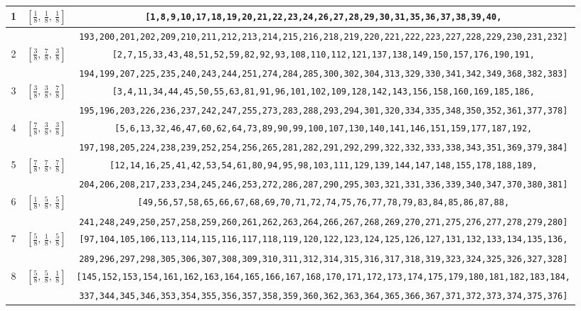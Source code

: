 \documentclass[fleqn,8pt]{jsarticle}
\begin{document}
\begin{longtable}{ccc}
1 & $\left[ \frac{1}{8},\, \frac{1}{8},\, \frac{1}{8} \right]$ & {\tt [1,8,9,10,17,18,19,20,21,22,23,24,26,27,28,29,30,31,35,36,37,38,39,40,} \\ \hline
 &  & {\tt 193,200,201,202,209,210,211,212,213,214,215,216,218,219,220,221,222,223,227,228,229,230,231,232]} \\ \hline
2 & $\left[ \frac{3}{8},\, \frac{7}{8},\, \frac{3}{8} \right]$ & {\tt [2,7,15,33,43,48,51,52,59,82,92,93,108,110,112,121,137,138,149,150,157,176,190,191,} \\ \hline
 &  & {\tt 194,199,207,225,235,240,243,244,251,274,284,285,300,302,304,313,329,330,341,342,349,368,382,383]} \\ \hline
3 & $\left[ \frac{3}{8},\, \frac{3}{8},\, \frac{7}{8} \right]$ & {\tt [3,4,11,34,44,45,50,55,63,81,91,96,101,102,109,128,142,143,156,158,160,169,185,186,} \\ \hline
 &  & {\tt 195,196,203,226,236,237,242,247,255,273,283,288,293,294,301,320,334,335,348,350,352,361,377,378]} \\ \hline
4 & $\left[ \frac{7}{8},\, \frac{3}{8},\, \frac{3}{8} \right]$ & {\tt [5,6,13,32,46,47,60,62,64,73,89,90,99,100,107,130,140,141,146,151,159,177,187,192,} \\ \hline
 &  & {\tt 197,198,205,224,238,239,252,254,256,265,281,282,291,292,299,322,332,333,338,343,351,369,379,384]} \\ \hline
5 & $\left[ \frac{7}{8},\, \frac{7}{8},\, \frac{7}{8} \right]$ & {\tt [12,14,16,25,41,42,53,54,61,80,94,95,98,103,111,129,139,144,147,148,155,178,188,189,} \\ \hline
 &  & {\tt 204,206,208,217,233,234,245,246,253,272,286,287,290,295,303,321,331,336,339,340,347,370,380,381]} \\ \hline
6 & $\left[ \frac{1}{8},\, \frac{5}{8},\, \frac{5}{8} \right]$ & {\tt [49,56,57,58,65,66,67,68,69,70,71,72,74,75,76,77,78,79,83,84,85,86,87,88,} \\ \hline
 &  & {\tt 241,248,249,250,257,258,259,260,261,262,263,264,266,267,268,269,270,271,275,276,277,278,279,280]} \\ \hline
7 & $\left[ \frac{5}{8},\, \frac{1}{8},\, \frac{5}{8} \right]$ & {\tt [97,104,105,106,113,114,115,116,117,118,119,120,122,123,124,125,126,127,131,132,133,134,135,136,} \\ \hline
 &  & {\tt 289,296,297,298,305,306,307,308,309,310,311,312,314,315,316,317,318,319,323,324,325,326,327,328]} \\ \hline
8 & $\left[ \frac{5}{8},\, \frac{5}{8},\, \frac{1}{8} \right]$ & {\tt [145,152,153,154,161,162,163,164,165,166,167,168,170,171,172,173,174,175,179,180,181,182,183,184,} \\ \hline
 &  & {\tt 337,344,345,346,353,354,355,356,357,358,359,360,362,363,364,365,366,367,371,372,373,374,375,376]} \\
\end{longtable}
\end{document}
